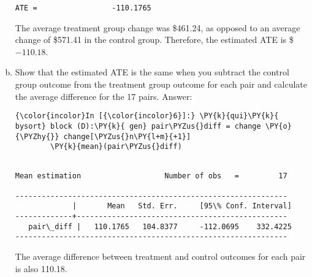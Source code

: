 \documentclass[11pt,notitlepage]{article}\usepackage[]{graphicx}\usepackage[]{color}
\makeatletter
\newenvironment{kframe}{%
 \def\at@end@of@kframe{}%
 \ifinner\ifhmode%
  \def\at@end@of@kframe{\end{minipage}}%
  \begin{minipage}{\columnwidth}%
 \fi\fi%
 \def\FrameCommand##1{\hskip\@totalleftmargin \hskip-\fboxsep
 \colorbox{shadecolor}{##1}\hskip-\fboxsep
     \hskip-\linewidth \hskip-\@totalleftmargin \hskip\columnwidth}%
 \MakeFramed {\advance\hsize-\width
   \@totalleftmargin\z@ \linewidth\hsize
   \@setminipage}}%
 {\par\unskip\endMakeFramed%
 \at@end@of@kframe}
\newenvironment{knitrout}{}{} %
\makeatother
\begin{document}
\begin{enumerate}[a)]
\begin{knitrout}
\begin{kframe}
\begin{Verbatim}[commandchars=\\\{\}]
ATE =                 -110.1765

    \end{Verbatim}
\end{kframe}
\end{knitrout}
The average treatment group change was \$461.24, as opposed to an average change of \$571.41 in the control group.  Therefore, the estimated ATE is \$\ensuremath{-110.18}.
\item Show that the estimated ATE is the same when you subtract the control group outcome from the treatment group outcome for each pair and calculate the average difference for the 17 pairs. 
Answer:\\
\begin{knitrout}
\color{fgcolor}\begin{kframe}
    \begin{Verbatim}[commandchars=\\\{\}]
{\color{incolor}In [{\color{incolor}6}]:} \PY{k}{qui}\PY{k}{ bysort} block (D):\PY{k}{ gen} pair\PYZus{}diff = change \PY{o}{\PYZhy{}} change[\PYZus{}n\PY{l+m}{+1}]
        \PY{k}{mean}(pair\PYZus{}diff)
\end{Verbatim}

    \begin{Verbatim}[commandchars=\\\{\}]

Mean estimation                   Number of obs   =         17

--------------------------------------------------------------
             |       Mean   Std. Err.     [95\% Conf. Interval]
-------------+------------------------------------------------
   pair\_diff |   110.1765   104.8377     -112.0695    332.4225
--------------------------------------------------------------

    \end{Verbatim}
\end{kframe}
\end{knitrout}
The average difference between treatment and control outcomes for each pair is also 110.18.


\end{enumerate}
\end{document}
